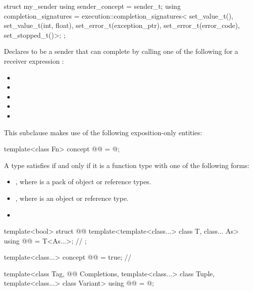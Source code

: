 \pnum
\begin{example}
\begin{codeblock}
struct my_sender {
  using sender_concept = sender_t;
  using completion_signatures =
    execution::completion_signatures<
      set_value_t(),
      set_value_t(int, float),
      set_error_t(exception_ptr),
      set_error_t(error_code),
      set_stopped_t()>;
};
\end{codeblock}
Declares  to be a sender
that can complete by calling one of the following
for a receiver expression :
\begin{itemize}
\item {}
\item {}
\item {}
\item {}
\item {}
\end{itemize}
\end{example}

\pnum
This subclause makes use of the following exposition-only entities:
\begin{codeblock}
template<class Fn>
  concept @@ = @\seebelow@;
\end{codeblock}

\pnum
A type  satisfies 
if and only if it is a function type with one of the following forms:
\begin{itemize}
\item
{},
where  is a pack of object or reference types.
\item
{},
where  is an object or reference type.
\item
{}
\end{itemize}

\pnum
\begin{codeblock}
template<bool>
  struct @@ {
    template<template<class...> class T, class... As>
      using @@ = T<As...>;                              // \expos
  };

template<class...>
  concept @@ = true;                                   // \expos

template<class Tag,
         @@ Completions,
         template<class...> class Tuple,
         template<class...> class Variant>
  using @@ = @\seebelow@;
\end{codeblock}

